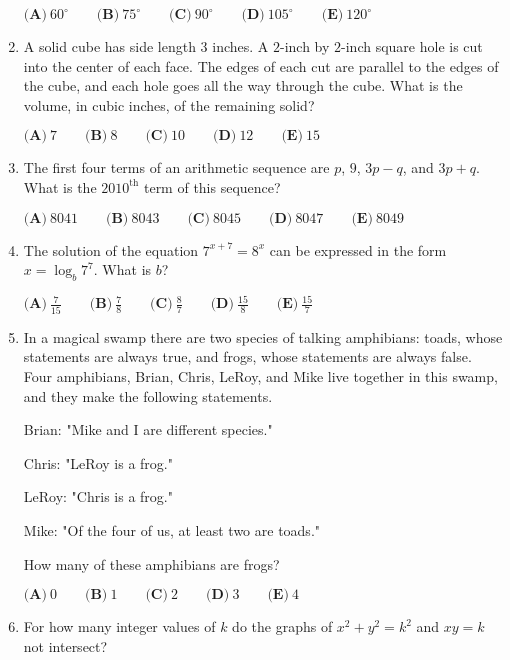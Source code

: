 \documentclass{article}
\begin{document}
\begin{enumerate}[label=\arabic*., itemsep=0.5em]
\(\textbf{(A)}\ 60^\circ \qquad \textbf{(B)}\ 75^\circ \qquad \textbf{(C)}\ 90^\circ \qquad \textbf{(D)}\ 105^\circ \qquad \textbf{(E)}\ 120^\circ\)\par \vspace{0.5em}\item A solid cube has side length \(3\) inches. A \(2\)-inch by \(2\)-inch square hole is cut into the center of each face. The edges of each cut are parallel to the edges of the cube, and each hole goes all the way through the cube. What is the volume, in cubic inches, of the remaining solid?

\(\textbf{(A)}\ 7 \qquad \textbf{(B)}\ 8 \qquad \textbf{(C)}\ 10 \qquad \textbf{(D)}\ 12 \qquad \textbf{(E)}\ 15\)\par \vspace{0.5em}\item The first four terms of an arithmetic sequence are \(p\), \(9\), \(3p-q\), and \(3p+q\). What is the \(2010^\text{th}\) term of this sequence?

\(\textbf{(A)}\ 8041 \qquad \textbf{(B)}\ 8043 \qquad \textbf{(C)}\ 8045 \qquad \textbf{(D)}\ 8047 \qquad \textbf{(E)}\ 8049\)\par \vspace{0.5em}\item The solution of the equation \(7^{x+7} = 8^x\) can be expressed in the form \(x = \log_b 7^7\). What is \(b\)?

\(\textbf{(A)}\ \frac{7}{15} \qquad \textbf{(B)}\ \frac{7}{8} \qquad \textbf{(C)}\ \frac{8}{7} \qquad \textbf{(D)}\ \frac{15}{8} \qquad \textbf{(E)}\ \frac{15}{7}\)\par \vspace{0.5em}\item In a magical swamp there are two species of talking amphibians: toads, whose statements are always true, and frogs, whose statements are always false. Four amphibians, Brian, Chris, LeRoy, and Mike live together in this swamp, and they make the following statements.

Brian: "Mike and I are different species."

Chris: "LeRoy is a frog."

LeRoy: "Chris is a frog."

Mike: "Of the four of us, at least two are toads."

How many of these amphibians are frogs?

\(\textbf{(A)}\ 0 \qquad \textbf{(B)}\ 1 \qquad \textbf{(C)}\ 2 \qquad \textbf{(D)}\ 3 \qquad \textbf{(E)}\ 4\)\par \vspace{0.5em}\item For how many integer values of \(k\) do the graphs of \(x^2+y^2=k^2\) and \(xy = k\) not intersect?


\end{enumerate}
\end{document}
